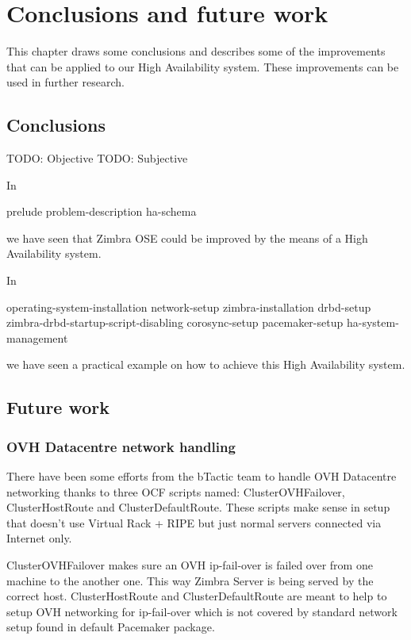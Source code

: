 

\chapter{Conclusions and future work}
\label{chap:conclusions-and-future-work}
This chapter draws some conclusions and describes some of the improvements that can be applied to our High Availability system. These improvements can be used in further research.

\section {Conclusions}

TODO: Objective
TODO: Subjective

In 

{prelude}
{problem-description}
{ha-schema}

we have seen that Zimbra OSE could be improved by the means of a High Availability system.

In 

{operating-system-installation}
{network-setup}
{zimbra-installation}
{drbd-setup}
{zimbra-drbd-startup-script-disabling}
{corosync-setup}
{pacemaker-setup}
{ha-system-management}

we have seen a practical example on how to achieve this High Availability system.

\section {Future work}

\subsection {OVH Datacentre network handling}
There have been some efforts from the bTactic team to handle OVH Datacentre networking thanks to three OCF scripts named: 
ClusterOVHFailover, ClusterHostRoute and ClusterDefaultRoute. These scripts make sense in setup that doesn't use Virtual Rack + RIPE but just normal servers connected via Internet only.

ClusterOVHFailover makes sure an OVH ip-fail-over is failed over from one machine to the another one. This way Zimbra Server is being served by the correct host.
ClusterHostRoute and ClusterDefaultRoute are meant to help to setup OVH networking for ip-fail-over which is not covered by standard network setup found in  default Pacemaker package.

